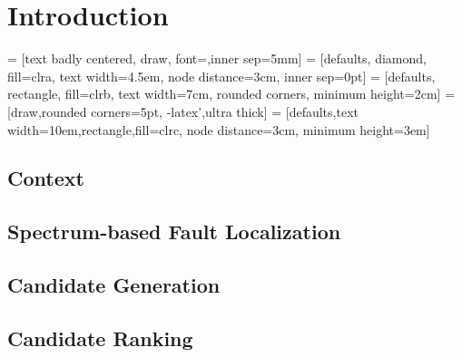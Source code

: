 \section{Introduction}
 = [text badly centered, draw, font=\Large,inner sep=5mm]
 = [defaults, diamond, fill=clra, text width=4.5em,  node distance=3cm, inner sep=0pt]
 = [defaults, rectangle, fill=clrb, text width=7cm, rounded corners, minimum height=2cm]
 = [draw,rounded corners=5pt, -latex',ultra thick]
 = [defaults,text width=10em,rectangle,fill=clrc, node distance=3cm, minimum height=3em]


\subsection{Context}
\frameready{}{
  
  
  
}

\subsection{Spectrum-based Fault Localization}
\frameready{}{
  
  
  
}

\subsection{Candidate Generation}
\frameready{}{
  
  
  
}

\subsection{Candidate Ranking}
\frameready{}{
  
  
  
}

